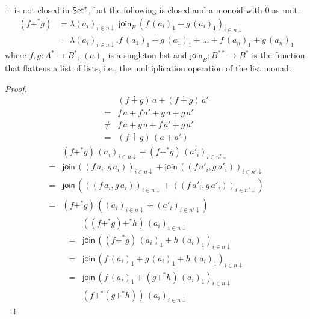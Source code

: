 \documentclass[runningheads,envcountsame]{llncs}
\begin{document}
\begin{lemma}
    $\dotplus$ is not closed in $\mathsf{Set}^*$, but the following is closed and a monoid with $\dot 0$ as unit.
    \begin{align}
        (f +^* g) &= \lambda (a_i)_{i\in n\downarrow}. \mathsf{join}_B\,(f\,(a_i)_1 + g\,(a_i)_1)_{i\in n\downarrow} \\
                  &= \lambda (a_i)_{i\in n\downarrow}. f\,(a_1)_1 + g\,(a_1)_1 + \dots + f\,(a_n)_1 + g\,(a_n)_1
    \end{align}
    where $f, g\colon A^* \to B^*$, $(a)_1$ is a singleton list and $\mathsf{join}_B\colon B^{**} \to B^*$ is the function that flattens a list of lists, i.e., the multiplication operation of the list monad.
\end{lemma}
\begin{proof}
    \begin{align}
      & (f \dotplus g)\,a + (f \dotplus g)\,a' \\
    = & f\,a + f\,a' + g\,a + g\,a' \\
    \neq & f\,a + g\,a + f\,a' + g\,a' \\
    = & (f \dotplus g)\,(a + a')
    \end{align}
    \begin{align}
      & (f +^* g)\,(a_i)_{i \in n\downarrow} + (f +^* g)\,(a'_i)_{i \in n'\downarrow} \\
    = & \mathsf{join}\,((f\,a_i, g\,a_i))_{i\in n\downarrow} + \mathsf{join}\,((f\,a'_i, g\,a'_i))_{i\in n'\downarrow} \\
    = & \mathsf{join}\,(((f\,a_i, g\,a_i))_{i\in n\downarrow} + ((f\,a'_i, g\,a'_i))_{i\in n'\downarrow}) \\
    = & (f +^* g)\,((a_i)_{i \in n\downarrow} + (a'_i)_{i \in n'\downarrow})
    \end{align}
    \begin{align}
      & ((f +^* g) +^* h)\,(a_i)_{i \in n\downarrow} \\
    = & \mathsf{join}\,((f +^* g)\,(a_i)_1 + h\,(a_i)_1)_{i\in n\downarrow} \\
    = & \mathsf{join}\,(f\,(a_i)_1 + g\,(a_i)_1 + h\,(a_i)_1)_{i\in n\downarrow} \\
    = & \mathsf{join}\,(f\,(a_i)_1 + (g +^* h)\,(a_i)_1)_{i\in n\downarrow} \\
      & (f +^* (g +^* h))\,(a_i)_{i \in n\downarrow}
    \end{align}
\end{proof}
\end{document}
